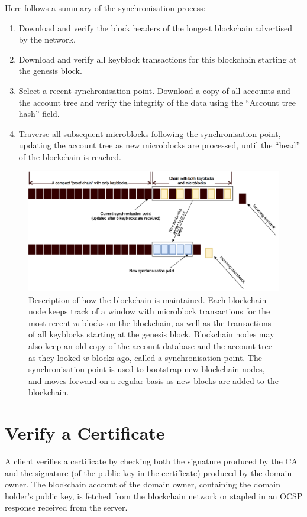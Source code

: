 \documentclass{style/kththesis}
\begin{document}
\begin{appendices}
\begin{itemize}
    Here follows a summary of the synchronisation process:
    \begin{enumerate}
        \item Download and verify the block headers of the longest blockchain advertised by the network.
        \item Download and verify all keyblock transactions for this blockchain starting at the genesis block.
        \item Select a recent synchronisation point. Download a copy of all accounts and the account tree and verify the integrity of the data using the ``Account tree hash'' field.
        \item Traverse all subsequent microblocks following the synchronisation point, updating the account tree as new microblocks are processed, until the ``head'' of the blockchain is reached.
    \end{enumerate}
\end{itemize}

\begin{figure}
    \centering
    \includegraphics[width=\textwidth]{figures/sync}
    \caption{Description of how the blockchain is maintained. Each blockchain node keeps track of a window with microblock transactions for the most recent $w$ blocks on the blockchain, as well as the transactions of all keyblocks starting at the genesis block. Blockchain nodes may also keep an old copy of the account database and the account tree as they looked $w$ blocks ago, called a synchronisation point. The synchronisation point is used to bootstrap new blockchain nodes, and moves forward on a regular basis as new blocks are added to the blockchain.}
    \label{fig:sync}
\end{figure}

\chapter{Verify a Certificate}
\label{app:verify-cert}
A client verifies a certificate by checking both the signature produced by the CA and the signature (of the public key in the certificate) produced by the domain owner. The blockchain account of the domain owner, containing the domain holder's public key, is fetched from the blockchain network or stapled in an OCSP response received from the server.


\end{appendices}
\end{document}
